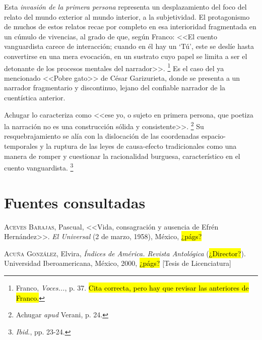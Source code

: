 \documentclass[14pt,twoside,final]{extbook} %
\let\oldfootnote\footnote
\renewcommand\footnote[1]{%
\oldfootnote{\hspace{1mm}#1}}
\begin{document}
Esta \emph{invasión de la primera persona} representa un desplazamiento del foco del relato del mundo exterior al mundo interior, a la subjetividad. El protagonismo de muchos de estos relatos recae por completo en esa interioridad fragmentada en un cúmulo de vivencias, al grado de que, según Franco: <<El cuento vanguardista carece
de interacción; cuando en él hay un `Tú', este se deslíe hasta convertirse en una
mera evocación, en un sustrato cuyo papel se limita a ser el detonante de los
procesos mentales del narrador>>.\footnote{Franco, \emph{Voces...}, p. 37. \hl{Cita correcta, pero hay que revisar las anteriores de Franco.}} Es el caso del ya mencionado <<Pobre gato>> de César Garizurieta, donde se presenta a un narrador fragmentario y discontinuo, lejano del confiable narrador de la cuentística anterior.

Achugar lo caracteriza como <<ese yo, o sujeto en primera persona, que poetiza la narración no es una construcción sólida y consistente>>.\footnote{Achugar \emph{apud} Verani, p. 24.} Su resquebrajamiento se alía con la dislocación de las coordenadas espacio-temporales y la ruptura de las leyes de causa-efecto tradicionales como una manera de romper y cuestionar la racionalidad burguesa, característico en el cuento vanguardista.\footnote{\emph{Ibid.}, pp. 23-24.}
\chapter*{Fuentes consultadas}\label{ch:fuentes-consultadas}
\thispagestyle{empty}
\pagestyle{fancy}
\fancyhf{} %
\fancyhead[RO,LE]{\textlf{\thepage}}
\renewcommand{\headrulewidth}{0pt}
\setcounter{page}{37}
\textsc{Aceves Barajas}, Pascual, <<Vida, consagración y ausencia de Efrén Hernández>>. \emph{El Universal} (2 de marzo, 1958), México, \hl{¿págs?} \label{bib:aceves1958}

\textsc{Acuña González}, Elvira, \emph{Índices de \emph{América}. Revista Antológica} (\hl{¿Director?}). Universidad Iberoamericana, México, 2000, \hl{¿págs?} [Tesis de Licenciatura]\label{bib:acuña2000}
\end{document}
